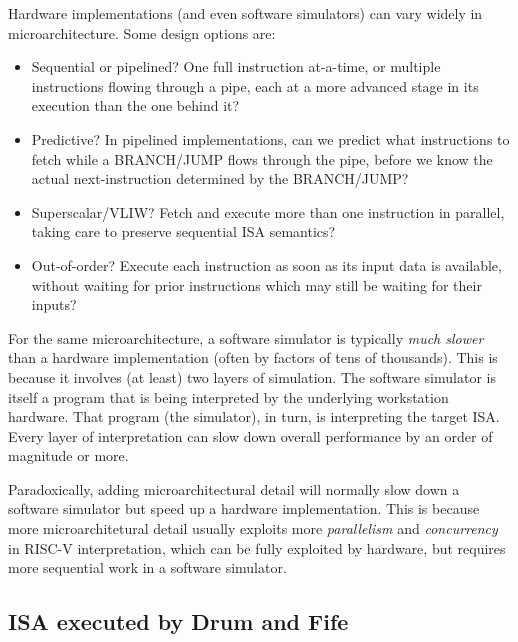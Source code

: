 Hardware implementations (and even software simulators) can vary
widely in microarchitecture.  Some design options are:

\begin{itemize}

  \item Sequential or pipelined?  One full instruction at-a-time, or
    multiple instructions flowing through a pipe, each at a more
    advanced stage in its execution than the one behind it?

  \item Predictive? In pipelined implementations, can we predict what
    instructions to fetch while a BRANCH/JUMP flows through the pipe,
    before we know the actual next-instruction determined by the
    BRANCH/JUMP?

  \item Superscalar/VLIW? Fetch and execute more than one instruction
    in parallel, taking care to preserve sequential ISA semantics?

  \item Out-of-order? Execute each instruction as soon as its input
    data is available, without waiting for prior instructions which
    may still be waiting for their inputs?

\end{itemize}

For the same microarchitecture, a software simulator is typically
\emph{much slower} than a hardware implementation (often by factors of
tens of thousands).  This is because it involves (at least) two layers
of simulation. The software simulator is itself a program that is
being interpreted by the underlying workstation hardware.  That
program (the simulator), in turn, is interpreting the target ISA.
Every layer of interpretation can slow down overall performance by
an order of magnitude or more.

Paradoxically, adding microarchitectural detail will normally slow
down a software simulator but speed up a hardware implementation.
This is because more microarchitetural detail usually exploits more
\emph{parallelism} and \emph{concurrency} in RISC-V interpretation,
which can be fully exploited by hardware, but requires more sequential
work in a software simulator.


\subsection{ISA executed by Drum and Fife}

